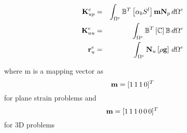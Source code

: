 
\begin{eqnarray}
\mathbf{K}^e_{up}
&=&
\int_{\Omega^e}
\mathbb{B}^T
\left[
\alpha_b S^l
\right]
\mathbf m{\mathbf{N}}_p
\,
d\Omega^e
\nonumber
\\
\mathbf{K}^e_{uu}
&=&
\int_{\Omega^e}
\mathbb{B}^T
\left[
\mathbb C
\right]
\mathbb{B}
\,
d\Omega^e
\nonumber
\\
\mathbf r^e_{u}
&=&
\int_{\Omega^e}
\mathbf{N}_u
\left[
\rho\mathbf g
\right]
\,
d\Omega^e
\end{eqnarray}

where m is a mapping vector as
\[\mathbf m = [1\, 1\, 1\, 0]^T\] 
for plane strain problems and
\[\mathbf m = [1\, 1\, 1\, 0\, 0\, 0]^T\] for 3D problems
